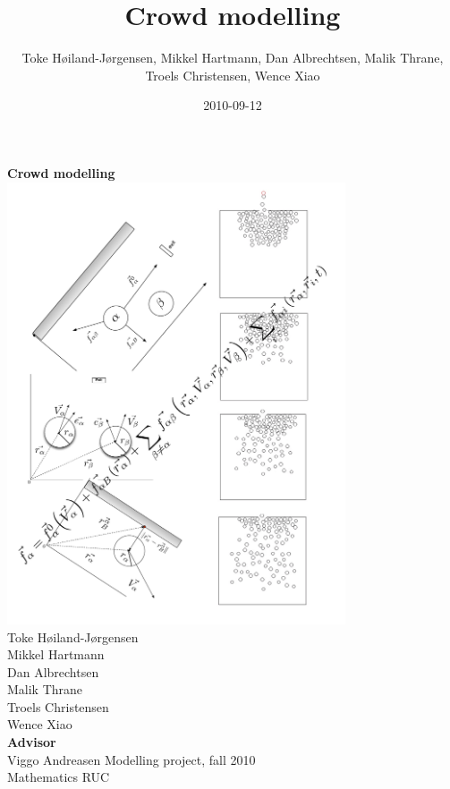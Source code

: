 \documentclass[a4paper,11pt,twoside]{scrartcl}
\title{Crowd modelling}
\author{Toke Høiland-Jørgensen, Mikkel Hartmann, Dan Albrechtsen, Malik 
Thrane, Troels Christensen, Wence Xiao}
\date{2010-09-12}
\begin{document}
\begin{titlepage}
    \begin{center}
        {\Huge \sffamily \textbf{Crowd modelling\\[2cm]
        }}\includegraphics[width=10cm]{Figures/Frontpage}
        \\[2cm]
        {\large Toke Høiland-Jørgensen \\
        Mikkel Hartmann\\
        Dan Albrechtsen\\
        Malik Thrane\\
        Troels Christensen\\
        Wence Xiao\\
        [0.5cm] }
        {\small \textbf{\textsf{Advisor}}\\
        Viggo Andreasen}
        \vfill
        \textsf{Modelling project, fall 2010\\
        Mathematics RUC}
	\end{center}
    \clearpage
%    
\end{titlepage}
\tableofcontents
\listoffigures
\listoftables
\lstlistoflistings
\clearpage

\clearpage

\clearpage

\clearpage

\clearpage

\clearpage

\clearpage

\clearpage

\clearpage

\clearpage


\clearpage
\end{document}
